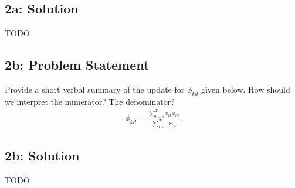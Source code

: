 \documentclass[10pt]{article}
\newcommand{\officialdirections}[1]{{\color{blue} #1}}
\begin{document}
\subsection{2a: Solution}

TODO


\newpage
\officialdirections{
\subsection*{2b: Problem Statement}
Provide a short verbal summary of the update for $\phi_{kd}$ given below. How should we interpret the numerator? The denominator?
\begin{align}
\phi_{kd} = \frac{ \sum_{t=1}^T r_{tk} x_{td} }{ \sum_{t=1}^T r_{tk} }
\end{align}
}

\subsection{2b: Solution}

TODO
\end{document}
